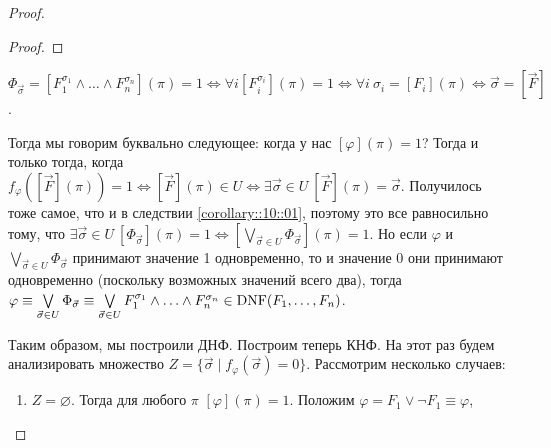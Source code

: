 \begin{proof}
\begin{enumerate}
\begin{proof}
        \end{proof}
        \begin{corollary} \label{corollary::10::01}
            $\Phi_{\vec{\sigma}} = [F_{1}^{\sigma_{1}} \land \ldots \land F_{n}^{\sigma_{n}}](\pi) = 1 \iff \forall i [F_{i}^{\sigma_{i}}](\pi) = 1 \iff \forall i~\sigma_{i} = [F_{i}](\pi) \iff \vec{\sigma} = [\vec{F}]$.
        \end{corollary}
        Тогда мы говорим буквально следующее: когда у нас $[\varphi](\pi) = 1$?
        Тогда и только тогда, когда $f_{\varphi}([\vec{F}](\pi)) = 1 \iff [\vec{F}](\pi) \in U \iff \exists \vec{\sigma} \in U~ [\vec{F}](\pi) = \vec{\sigma}$.
        Получилось тоже самое, что и в следствии \ref{corollary::10::01}, поэтому это все равносильно тому, что $\exists \vec{\sigma} \in U~[\Phi_{\vec{\sigma}}](\pi) = 1 \iff [\bigvee\limits_{\vec{\sigma} \in U}\Phi_{\vec{\sigma}}](\pi) = 1$.
        Но если $\varphi$ и $\bigvee\limits_{\vec{\sigma} \in U}\Phi_{\vec{\sigma}}$ принимают значение 1 одновременно, то и значение 0 они принимают одновременно (поскольку возможных значений всего два), тогда $\varphi \equiv \bigvee\limits_{\vec{\sigma} \in U}\Phi_{\vec{\sigma}} \equiv \bigvee\limits_{\vec{\sigma} \in U} F_{1}^{\sigma_{1}} \land \ldots \land F_{n}^{\sigma_{n}} \in \operatorname{DNF}(F_{1}, \ldots, F_{n})$.
    \end{enumerate}
    Таким образом, мы построили ДНФ.
    Построим теперь КНФ.
    На этот раз будем анализировать множество $Z = \{\vec{\sigma} \mid f_{\varphi}(\vec{\sigma}) = 0\}$.
    Рассмотрим несколько случаев:
    \begin{enumerate}
        \item $Z = \varnothing$.
        Тогда для любого $\pi$ $[\varphi](\pi) = 1$.
        Положим $\varphi = F_{1} \lor \neg F_{1} \equiv \varphi$,
    \end{enumerate}
\end{proof}
